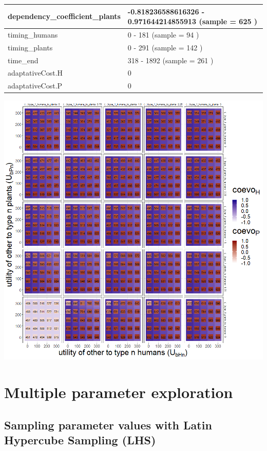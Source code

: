 \documentclass[
]{book}
\begin{document}
\begin{table}[!h]
\begin{tabular}[t]{l|l}
\hline
dependency\_coefficient\_plants & -0.818236588616326 - 0.971644214855913 (sample = 625 )\\
\hline
timing\_humans & 0 - 181 (sample = 94 )\\
\hline
timing\_plants & 0 - 291 (sample = 142 )\\
\hline
time\_end & 318 - 1892 (sample = 261 )\\
\hline
adaptativeCost.H & 0\\
\hline
adaptativeCost.P & 0\\
\hline
\end{tabular}
\end{table}

\newpage

\includegraphics[width=1\linewidth]{plots/4_exp_utility_inverse_boundaries-tripleRaster_fourParameterss}

\hypertarget{multiple-parameter-exploration}{%
\chapter{Multiple parameter exploration}\label{multiple-parameter-exploration}}

\newpage

\hypertarget{sampling-parameter-values-with-latin-hypercube-sampling-lhs}{%
\section{Sampling parameter values with Latin Hypercube Sampling (LHS)}\label{sampling-parameter-values-with-latin-hypercube-sampling-lhs}}
\end{document}
